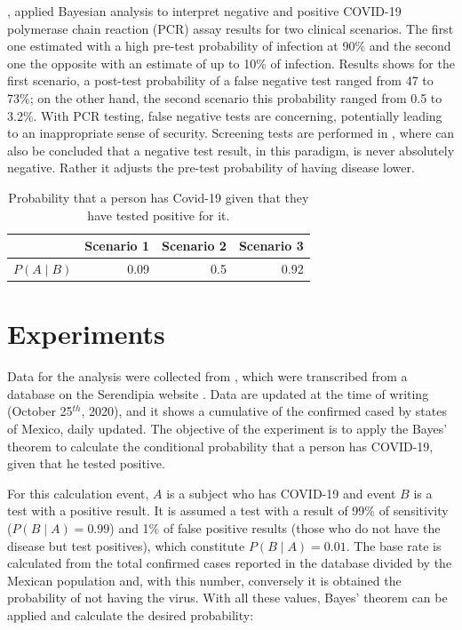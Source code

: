\documentclass[10pt,leter,openany]{article}
\begin{document}
	 \citet{good2020}, applied Bayesian analysis to interpret negative and positive COVID-19 polymerase chain reaction (PCR) assay results for two clinical scenarios. The first one estimated with a high pre-test probability of infection at 90\% and the second one the opposite with an estimate of up to 10\% of infection. Results shows for the first scenario, a post-test probability of a false negative test ranged from 47 to 73\%; on the other hand, the second scenario this probability ranged from  0.5 to 3.2\%. With PCR testing, false negative tests are concerning, potentially leading to an inappropriate sense of security. Screening tests are performed in \citet{chan2020}, where can also be concluded that a negative test result, in this paradigm, is never absolutely negative. Rather it adjusts the pre-test probability of having disease lower.
	
	
\begin{table}[]
	\centering
	\caption{Probability that a person has Covid-19 given that they have tested positive for it.}
	\label{tab:probScenarios}
	\begin{tabular}{|l|c|c|c|}
		\hline
		& \textbf{Scenario 1}       & \textbf{Scenario 2}      & \textbf{Scenario 3}       \\ \hline
		$P(A\mid B)$ & \multicolumn{1}{r|}{0.09} & \multicolumn{1}{r|}{0.5} & \multicolumn{1}{r|}{0.92} \\ \hline
	\end{tabular}
\end{table}
	
	\section{Experiments}
	
	Data for the analysis were collected from \citet{github_mx}, which were transcribed from a database on the Serendipia website \citep{serendipia}. Data are updated at the time of writing (October 25$ ^{th} $, 2020), and it shows a cumulative of the confirmed cased by states of Mexico, daily updated. The objective of the experiment is to apply the Bayes' theorem to calculate the conditional probability that a person has COVID-19, given that he tested positive. 
	
	
	For this calculation event, $ A $ is a subject who has COVID-19 and event $ B $ is a test with a positive result. It is assumed a test with a result of 99\% of sensitivity ($P(B\mid A) =0.99$) and 1\% of false positive results (those who do not have the disease but test positives), which constitute $P(B\mid A) = 0.01$. The base rate is calculated from the total confirmed cases reported in the database divided by the Mexican population and, with this number, conversely it is obtained the probability of not having the virus. With all these values, Bayes' theorem can be applied and calculate the desired probability:
	
\end{document}
